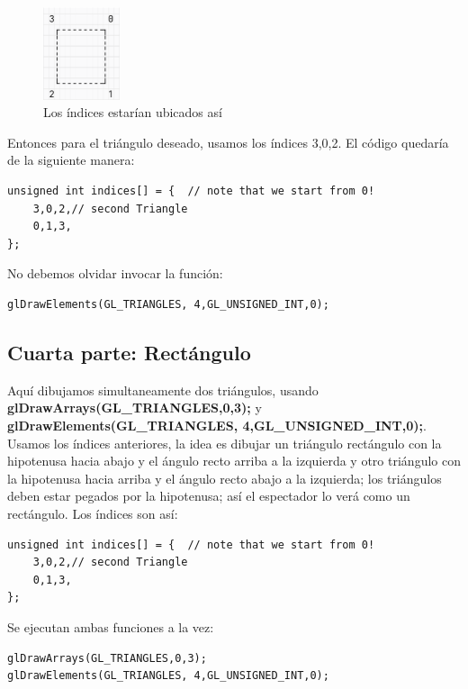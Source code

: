\documentclass[a4paper,11pt]{article}                 %
\begin{document}
\begin{figure}[H] %
    \centering %
    \includegraphics[width=0.2\textwidth]{images/img1.png} %
    \caption{Los índices estarían ubicados así} %
    \label{fig:indices} %
\end{figure}
Entonces para el triángulo deseado, usamos los índices 3,0,2. El código quedaría de la siguiente manera:
\begin{lstlisting}[style=cppstyle]
unsigned int indices[] = {  // note that we start from 0!
    3,0,2,// second Triangle
    0,1,3,
};
\end{lstlisting}
No debemos olvidar invocar la función:
\begin{lstlisting}[style=cppstyle]
glDrawElements(GL_TRIANGLES, 4,GL_UNSIGNED_INT,0);
\end{lstlisting}

\subsection{Cuarta parte: Rectángulo}
Aquí dibujamos simultaneamente dos triángulos, usando \textbf{glDrawArrays(GL\_TRIANGLES,0,3);} y \textbf{glDrawElements(GL\_TRIANGLES, 4,GL\_UNSIGNED\_INT,0);}. Usamos los índices anteriores, la idea es dibujar un triángulo rectángulo con la hipotenusa hacia abajo y el ángulo recto arriba a la izquierda y otro triángulo con la hipotenusa hacia arriba y el ángulo recto abajo a la izquierda; los triángulos deben estar pegados por la hipotenusa; así el espectador lo verá como un rectángulo.
Los índices son así:
\begin{lstlisting}[style=cppstyle]
unsigned int indices[] = {  // note that we start from 0!
    3,0,2,// second Triangle
    0,1,3,
};

\end{lstlisting}
Se ejecutan ambas funciones a la vez:
\begin{lstlisting}[style=cppstyle]
glDrawArrays(GL_TRIANGLES,0,3);
glDrawElements(GL_TRIANGLES, 4,GL_UNSIGNED_INT,0);
\end{lstlisting}
\end{document}
